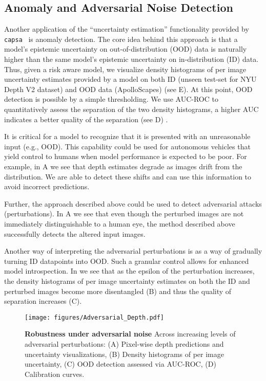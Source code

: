 \documentclass{article} %
\def\capsa{\texttt{{capsa}}}
\begin{document}
\subsection{Anomaly and Adversarial Noise Detection}

Another application of the “uncertainty estimation” functionality provided by \capsa~ is anomaly detection. The core idea behind this approach is that a model's epistemic uncertainty on out-of-distribution (OOD) data is naturally higher than the same model’s epistemic uncertainty on in-distribution (ID) data. Thus, given a risk aware model, we visualize density histograms of per image uncertainty estimates provided by a model on both ID (unseen test-set for NYU Depth V2 dataset) and OOD data (ApolloScapes) (see E). At this point, OOD detection is possible by a simple thresholding. We use AUC-ROC to quantitatively assess the separation of the two density histograms, a higher AUC indicates a better quality of the separation (see D) .

It is critical for a model to recognize that it is presented with an unreasonable input (e.g., OOD). This capability could be used for autonomous vehicles that yield control to humans when model performance is expected to be poor. For example, in A we see that depth estimates degrade as images drift from the distribution. We are able to detect these shifts and can use this information to avoid incorrect predictions. 

Further, the approach described above could be used to detect adversarial attacks (perturbations). In A we see that even though the perturbed images are not immediately distinguishable to a human eye, the method described above successfully detects the altered input images.

Another way of interpreting the adversarial perturbations is as a way of gradually turning ID datapoints into OOD. Such a granular control allows for enhanced model introspection. In  we see that as the epsilon of the perturbation increases, the density histograms of per image uncertainty estimates on both the ID and perturbed images become more disentangled (B) and thus the quality of separation increases (C).

\begin{figure}[t!]
\centering
\texttt{[image: figures/Adversarial\_Depth.pdf]}
\caption{\textbf{Robustness under adversarial noise} Across increasing levels of adversarial perturbations: (A) Pixel-wise depth predictions and uncertainty visualizations, (B) Density histograms of per image uncertainty, (C) OOD detection assessed via AUC-ROC, (D) Calibration curves.}
\label{fig:adversarial}
\end{figure}
\end{document}
